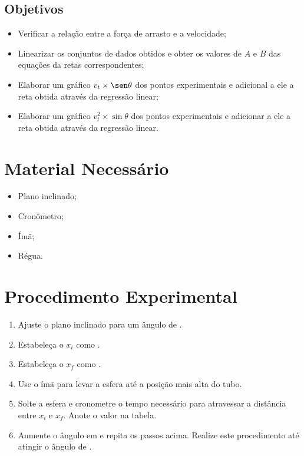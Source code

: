 \subsection{Objetivos}

\begin{itemize}
     \item Verificar a relação entre a força de arrasto e a velocidade;
	 \item Linearizar os conjuntos de dados obtidos e obter os valores de $A$ e $B$ das equações da retas correspondentes;
     \item Elaborar um gráfico $v_t \times \sen\theta$ dos pontos experimentais e adicional a ele a reta obtida através da regressão linear;
	 \item Elaborar um gráfico $v_t^2 \times \sin\theta$ dos pontos experimentais e adicionar a ele a reta obtida através da regressão linear.
\end{itemize}

\section{Material Necessário}

\begin{itemize}
	\item Plano inclinado;
	\item Cronômetro;
	\item Ímã;
	\item Régua.
\end{itemize}

\section{Procedimento Experimental}

\begin{enumerate}
	\item Ajuste o plano inclinado para um ângulo de .
	\item Estabeleça o $x_i$ como .
	\item Estabeleça o $x_f$ como .
	\item Use o ímã para levar a esfera até a posição mais alta do tubo.
	\item Solte a esfera e cronometre o tempo necessário para atravessar a distância entre $x_i$ e $x_f$. Anote o valor na tabela.
	\item Aumente o ângulo em  e repita os passos acima. Realize este procedimento até atingir o ângulo de .
\end{enumerate}


